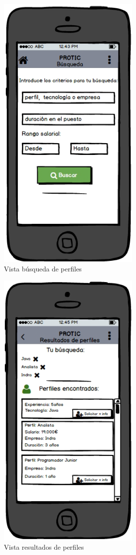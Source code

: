 \documentclass[a4paper, 12pt]{book}
\begin{document}
    \begin{figure}
        \centering
        \includegraphics[width=7cm, keepaspectratio]{img/old_vista_busqueda_de_perfiles.PNG}
        \caption{Vista búsqueda de perfiles}
    \end{figure}

    \begin{figure}
        \centering
        \includegraphics[width=7cm, keepaspectratio]{img/old_vista_resultados_de_perfiles.PNG}
        \caption{Vista resultados de perfiles}
    \end{figure}
\end{document}
